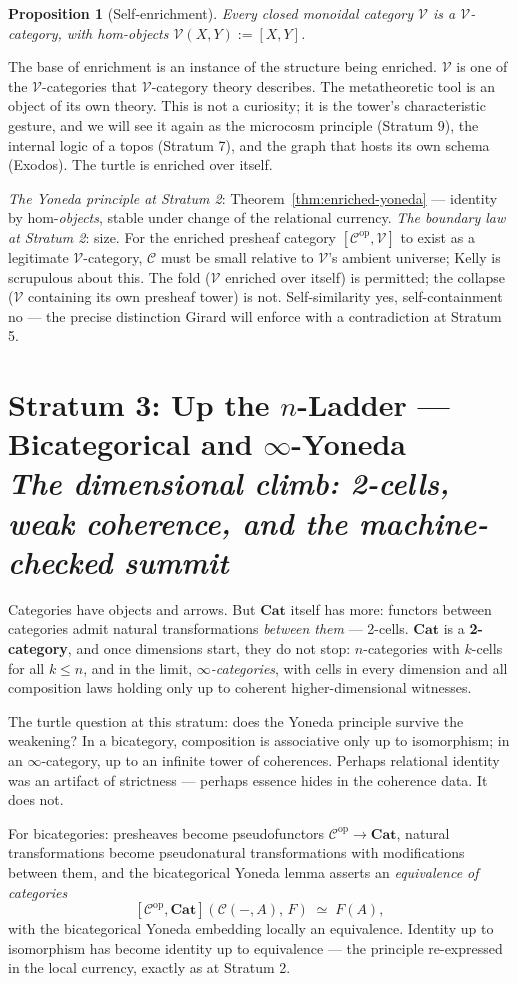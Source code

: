 \documentclass[11pt]{article}
\theoremstyle{plain}
\newtheorem{proposition}[theorem]{Proposition}
\theoremstyle{definition}
\theoremstyle{remark}
\newcommand{\C}{\mathcal{C}}
\newcommand{\V}{\mathcal{V}}
\newcommand{\Cat}{\mathbf{Cat}}
\newcommand{\op}{\mathrm{op}}
\newcommand{\stratum}[2]{\section{#1 \\ {\normalsize\normalfont\itshape #2}}}
\begin{document}
\begin{proposition}[Self-enrichment]
Every closed monoidal category $\V$ is a $\V$-category, with hom-objects $\V(X,Y) := [X,Y]$.
\end{proposition}

The base of enrichment is an instance of the structure being enriched. $\V$ is one of the $\V$-categories that $\V$-category theory describes. The metatheoretic tool is an object of its own theory. This is not a curiosity; it is the tower's characteristic gesture, and we will see it again as the microcosm principle (Stratum 9), the internal logic of a topos (Stratum 7), and the graph that hosts its own schema (Exodos). The turtle is enriched over itself.

\begin{refrain}
\emph{The Yoneda principle at Stratum 2}: Theorem~\ref{thm:enriched-yoneda} --- identity by hom-\emph{objects}, stable under change of the relational currency. \emph{The boundary law at Stratum 2}: size. For the enriched presheaf category $[\C^{\op},\V]$ to exist as a legitimate $\V$-category, $\C$ must be small relative to $\V$'s ambient universe; Kelly is scrupulous about this. The fold ($\V$ enriched over itself) is permitted; the collapse ($\V$ containing its own presheaf tower) is not. Self-similarity yes, self-containment no --- the precise distinction Girard will enforce with a contradiction at Stratum 5.
\end{refrain}

\stratum{Stratum 3: Up the $n$-Ladder --- Bicategorical and $\infty$-Yoneda}{The dimensional climb: 2-cells, weak coherence, and the machine-checked summit}

Categories have objects and arrows. But $\Cat$ itself has more: functors between categories admit natural transformations \emph{between them} --- 2-cells. $\Cat$ is a \textbf{2-category}, and once dimensions start, they do not stop: $n$-categories with $k$-cells for all $k \le n$, and in the limit, \emph{$\infty$-categories}, with cells in every dimension and all composition laws holding only up to coherent higher-dimensional witnesses.

The turtle question at this stratum: does the Yoneda principle survive the weakening? In a bicategory, composition is associative only up to isomorphism; in an $\infty$-category, up to an infinite tower of coherences. Perhaps relational identity was an artifact of strictness --- perhaps essence hides in the coherence data. It does not.

For bicategories: presheaves become pseudofunctors $\C^{\op} \to \Cat$, natural transformations become pseudonatural transformations with modifications between them, and the bicategorical Yoneda lemma asserts an \emph{equivalence of categories}
\[
[\C^{\op}, \Cat](\C(-,A),\, F) \;\simeq\; F(A),
\]
with the bicategorical Yoneda embedding locally an equivalence. Identity up to isomorphism has become identity up to equivalence --- the principle re-expressed in the local currency, exactly as at Stratum 2.
\end{document}
